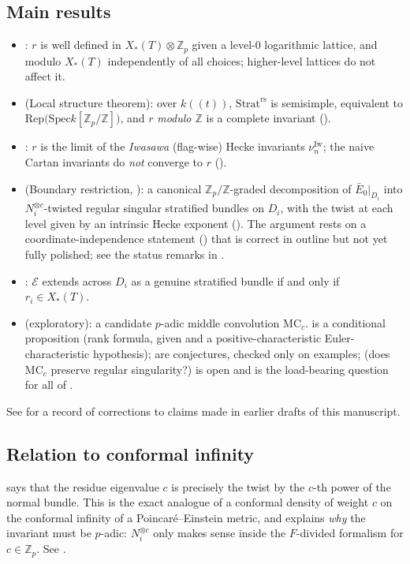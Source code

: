 \documentclass[11pt,reqno]{amsart}
\newcommand{\Zp}{\mathbb{Z}_p}
\newcommand{\ZZ}{\mathbb{Z}}
\newcommand{\cE}{\mathcal{E}}
\newcommand{\Strat}{\mathrm{Strat}}
\newcommand{\rs}{\mathrm{rs}}
\newcommand{\Rep}{\mathrm{Rep}}
\newcommand{\Spec}{\mathrm{Spec}}
\newcommand{\Iw}{\mathrm{Iw}}
\newcommand{\MC}{\mathrm{MC}}
\newcommand{\Xst}{X_*(T)}
\theoremstyle{plain}
\theoremstyle{definition}
\theoremstyle{remark}
\numberwithin{equation}{section}
\begin{document}
\subsection{Main results}
\begin{itemize}
\item {}: $r$ is well defined in $\Xst\otimes\Zp$ given a
      level-$0$ logarithmic lattice, and modulo $\Xst$ independently of
      all choices; higher-level lattices do not affect it.
\item {} (Local structure theorem): over $k((t))$,
      $\Strat^{\rs}$ is semisimple, equivalent to
      $\Rep\bigl(\Spec k[\Zp/\ZZ]\bigr)$, and $r$ \emph{modulo $\ZZ$} is a
      complete invariant ().
\item {}: $r$ is the limit of the \emph{Iwasawa}
      (flag-wise) Hecke invariants $\nu_n^{\Iw}$; the naive Cartan
      invariants do \emph{not} converge to $r$
      ().
\item {} (Boundary restriction, ): a
      canonical $\Zp/\ZZ$-graded decomposition of $\bar E_0|_{D_i}$ into
      $N_i^{\otimes c}$-twisted regular singular stratified bundles on
      $D_i$, with the twist at each level given by an intrinsic Hecke
      exponent ().  The argument rests on a
      coordinate-independence statement () that is
      correct in outline but not yet fully polished; see the status
      remarks in .
\item {}: $\cE$ extends across $D_i$ as a genuine
      stratified bundle if and only if $r_i\in\Xst$.
\item {} (exploratory): a candidate $p$-adic middle
      convolution $\MC_c$.   is a conditional
      proposition (rank formula, given  and a
      positive-characteristic Euler-characteristic hypothesis);
       are conjectures, checked only on
      examples;  (does $\MC_c$ preserve regular
      singularity?) is open and is the load-bearing question for all of
      .
\end{itemize}

See  for a record of corrections to claims made in
earlier drafts of this manuscript.

\subsection{Relation to conformal infinity}
 says that the residue eigenvalue $c$ is precisely the
twist by the $c$-th power of the normal bundle.  This is the exact
analogue of a conformal density of weight $c$ on the conformal infinity of
a Poincar\'e--Einstein metric, and explains \emph{why} the invariant must
be $p$-adic: $N_i^{\otimes c}$ only makes sense inside the $F$-divided
formalism for $c\in\Zp$.  See .
\end{document}
